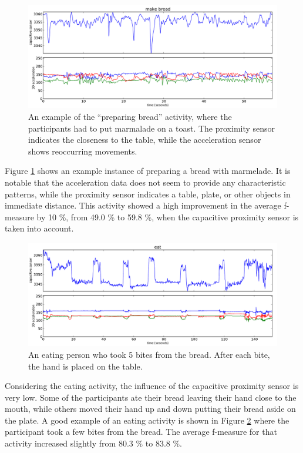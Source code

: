 \documentclass[runningheads,a4paper]{llncs}
\begin{document}
\begin{figure}
	\centering
		\includegraphics[width=\textwidth]{../Auswertung/images/eugen_5.pdf}
	\caption{An example of the ``preparing bread'' activity, where the participants had to put marmalade on a toast. The proximity sensor indicates the closeness to the table, while the acceleration sensor shows reoccurring movements.}
	\label{fig:eugen_5}
\end{figure}

Figure \ref{fig:eugen_5} shows an example instance of preparing a bread with marmelade. It is notable that the acceleration data does not seem to provide any characteristic patterns, while the proximity sensor indicates a table, plate, or other objects in immediate distance. This activity showed a high improvement in the average f-measure by 10 \%, from 49.0 \% to 59.8 \%, when the capacitive proximity sensor is taken into account. 

\begin{figure}
	\centering
		\includegraphics[width=\textwidth]{../Auswertung/images/eugen_6.pdf}
	\caption{An eating person who took 5 bites from the bread. After each bite, the hand is placed on the table.}
	\label{fig:eugen_6}
\end{figure}

Considering the eating activity, the influence of the capacitive proximity sensor is very low. Some of the participants ate their bread leaving their hand close to the mouth, while others moved their hand up and down putting their bread aside on the plate. A good example of an eating activity is shown in Figure \ref{fig:eugen_6} where the participant took a few bites from the bread. The average f-measure for that activity increased slightly from 80.3 \% to 83.8 \%. 
\end{document}
